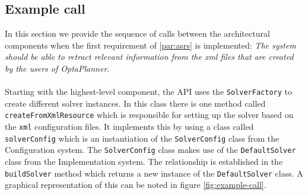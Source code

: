 \subsection{Example call}
\label{sec:example-call}
In this section we provide the sequence of calls between the architectural components when the first requirement of \ref{par:asrs} is implemented: \textit{The system should be able to retract relevant information  from the xml files that are created by the users of OptaPlanner}.\\\\
Starting with the highest-level component, the API uses the \verb!SolverFactory! to create different solver instances. 
In this class there is one method called \verb!createFromXmlResource! which is responsible for setting up the solver based on the \verb!xml! configuration files. It implements this by using a class called \verb!solverConfig! which is an instantiation of the \verb!SolverConfig! class from the Configuration system. 
The \verb!SolverConfig! class makes use of the \verb!DefaultSolver! class from the Implementation system. The relationship is established in the \verb!buildSolver! method which returns a new instance of the \verb!DefaultSolver! class. A graphical representation of this can be noted in figure \ref{fig:example-call}. 
